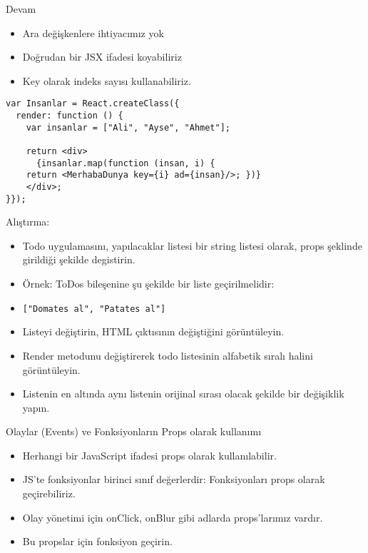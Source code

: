 \documentclass[presentation]{beamer}
\begin{document}
\begin{frame}[fragile,label={sec:org7fec748}]{Devam}
 \begin{itemize}
\item Ara değişkenlere ihtiyacımız yok
\item Doğrudan bir JSX ifadesi koyabiliriz
\item Key olarak indeks sayısı kullanabiliriz.
\end{itemize}

\begin{verbatim}
var Insanlar = React.createClass({
  render: function () {
    var insanlar = ["Ali", "Ayse", "Ahmet"];

    return <div>
      {insanlar.map(function (insan, i) {
	return <MerhabaDunya key={i} ad={insan}/>; })}
    </div>;
}});
\end{verbatim}
\end{frame}

\begin{frame}[fragile,label={sec:org00aa166}]{Alıştırma:}
 \begin{itemize}
\item Todo uygulamasını, yapılacaklar listesi bir string listesi olarak, props
şeklinde girildiği şekilde degistirin.
\item Örnek: ToDos bileşenine şu şekilde bir liste geçirilmelidir:
\item \texttt{["Domates al", "Patates al"]}
\item Listeyi değiştirin, HTML çıktısının değiştiğini görüntüleyin.
\item Render metodunu değiştirerek todo listesinin alfabetik sıralı halini görüntüleyin.
\item Listenin en altında aynı listenin orijinal sırası olacak şekilde bir
değişiklik yapın.
\end{itemize}
\end{frame}


\begin{frame}[label={sec:orgd46ca07}]{Olaylar (Events) ve Fonksiyonların Props olarak kullanımı}
\begin{itemize}
\item Herhangi bir JavaScript ifadesi props olarak kullanılabilir.
\item JS'te fonksiyonlar birinci sınıf değerlerdir: Fonksiyonları props olarak
geçirebiliriz.
\item Olay yönetimi için onClick, onBlur gibi adlarda props'larımız vardır.
\item Bu propslar için fonksiyon geçirin.
\end{itemize}
\end{frame}
\end{document}
